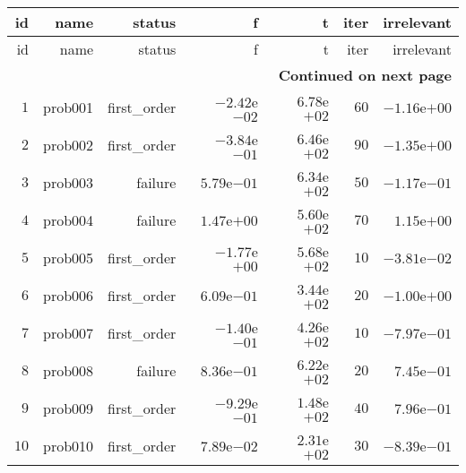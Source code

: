 \documentclass[varwidth=20cm,crop=true]{standalone}
\begin{document}
\begin{longtable}{rrrrrrr}
  \hline
  id & name & status & f & t & iter & irrelevant \\\hline
  \endfirsthead
  \hline
  id & name & status & f & t & iter & irrelevant \\\hline
  \endhead
  \hline
  \multicolumn{7}{r}{{\bfseries Continued on next page}}\\
  \hline
  \endfoot
  \endlastfoot
  \(     1\) & prob001 & first\_order & \(-2.42\)e\(-02\) & \( 6.78\)e\(+02\) & \(    60\) & \(-1.16\)e\(+00\) \\
  \(     2\) & prob002 & first\_order & \(-3.84\)e\(-01\) & \( 6.46\)e\(+02\) & \(    90\) & \(-1.35\)e\(+00\) \\
  \(     3\) & prob003 & failure & \( 5.79\)e\(-01\) & \( 6.34\)e\(+02\) & \(    50\) & \(-1.17\)e\(-01\) \\
  \(     4\) & prob004 & failure & \( 1.47\)e\(+00\) & \( 5.60\)e\(+02\) & \(    70\) & \( 1.15\)e\(+00\) \\
  \(     5\) & prob005 & first\_order & \(-1.77\)e\(+00\) & \( 5.68\)e\(+02\) & \(    10\) & \(-3.81\)e\(-02\) \\
  \(     6\) & prob006 & first\_order & \( 6.09\)e\(-01\) & \( 3.44\)e\(+02\) & \(    20\) & \(-1.00\)e\(+00\) \\
  \(     7\) & prob007 & first\_order & \(-1.40\)e\(-01\) & \( 4.26\)e\(+02\) & \(    10\) & \(-7.97\)e\(-01\) \\
  \(     8\) & prob008 & failure & \( 8.36\)e\(-01\) & \( 6.22\)e\(+02\) & \(    20\) & \( 7.45\)e\(-01\) \\
  \(     9\) & prob009 & first\_order & \(-9.29\)e\(-01\) & \( 1.48\)e\(+02\) & \(    40\) & \( 7.96\)e\(-01\) \\
  \(    10\) & prob010 & first\_order & \( 7.89\)e\(-02\) & \( 2.31\)e\(+02\) & \(    30\) & \(-8.39\)e\(-01\) \\\hline
\end{longtable}
\end{document}
